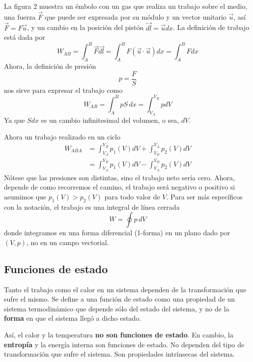 \documentclass{article}
\begin{document}
La figura 2
muestra un émbolo con un gas que realiza un trabajo sobre el medio, una fuerza
$\vec{F}$ que puede ser expresada por su módulo y un vector unitario $\vec{u}$,
así $\vec{F}=F\vec{u}$, y un cambio en la posición del pistón $\vec{dl} =
    \vec{u}dx$. La definición de trabajo está dada por
\begin{equation}
    W_{AB} = \int_{A}^{B}{\vec{F}\vec{dl}} = \int_{A}^{B}{F(\vec{u}
    \cdot\vec{u})dx} = \int_{A}^{B}{Fdx}
\end{equation}
Ahora, la definición de presión
\begin{equation}
    p=\frac{F}{S}
\end{equation}
nos sirve para expresar el trabajo como
\begin{equation}
    W_{AB} = \int_{A}^{B}{pS\,dx} = \int_{V_A}^{V_B}{p dV}
\end{equation}
Ya que $Sdx$ es un cambio infinitesimal del volumen, o sea, $dV$.

Ahora un trabajo realizado en un ciclo
\begin{equation}
    \begin{split}
        W_{ABA} &= \int_{V_A}^{V_B}{p_1(V) dV} + \int_{V_B}^{V_A}{p_2(V) dV}
        \\[1em]
        &= \int_{V_A}^{V_B}{p_1(V) dV} - \int_{V_A}^{V_B}{p_2(V) dV}
    \end{split}
\end{equation}
Nótese que las presiones son distintas, sino el trabajo neto sería cero. Ahora,
depende de como recorremos el camino, el trabajo será negativo o positivo si
asumimos que $p_1(V) > p_2(V)$ para todo valor de $V$. Para ser más específicos
con la notación, el trabajo es una integral de línea cerrada
\begin{equation}
    W = \oint p\, dV
\end{equation}
donde integramos en una forma diferencial (1-forma) en un plano dado por
$(V,p)$, no en un campo vectorial.

\subsection{Funciones de estado}
Tanto el trabajo como el calor en un sistema dependen de la transformación que
sufre el mismo. Se define a una función de estado como una propiedad de un
sistema termodinámico que depende sólo del estado del sistema, y no de la
\textbf{forma} en que el sistema llegó a dicho estado.

Así, el calor y la temperatura \textbf{no son funciones de estado}. En cambio,
la \textbf{entropía} y la energía interna son funciones de estado.
No dependen del tipo de transformación que sufre el sistema. Son propiedades
intrínsecas del sistema.
\end{document}
